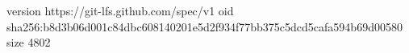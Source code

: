 version https://git-lfs.github.com/spec/v1
oid sha256:b8d3b06d001c84dbc608140201e5d2f934f77bb375c5dcd5cafa594b69d00580
size 4802
